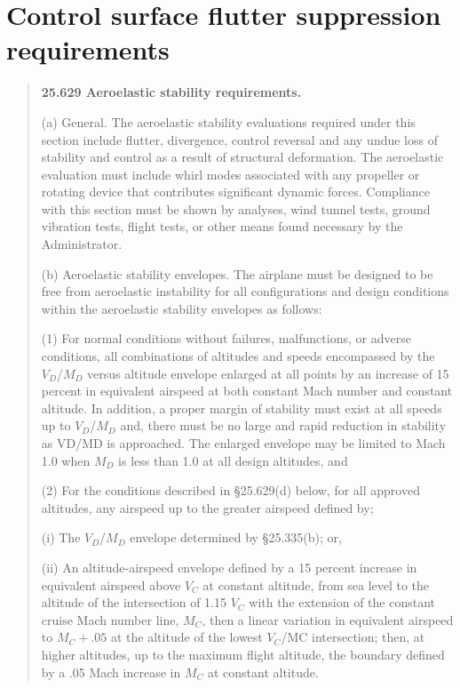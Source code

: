 \section{Control surface flutter suppression requirements}

\begin{quotation}
\begin{scriptsize}

\textbf{25.629   Aeroelastic stability requirements.}

(a) General. The aeroelastic stability evaluations required under this section include flutter, divergence, control reversal and any undue loss of stability and control as a result of structural deformation. The aeroelastic evaluation must include whirl modes associated with any propeller or rotating device that contributes significant dynamic forces. Compliance with this section must be shown by analyses, wind tunnel tests, ground vibration tests, flight tests, or other means found necessary by the Administrator.

(b) Aeroelastic stability envelopes. The airplane must be designed to be free from aeroelastic instability for all configurations and design conditions within the aeroelastic stability envelopes as follows:

(1) For normal conditions without failures, malfunctions, or adverse conditions, all combinations of altitudes and speeds encompassed by the $V_D$/$M_D$ versus altitude envelope enlarged at all points by an increase of 15 percent in equivalent airspeed at both constant Mach number and constant altitude. In addition, a proper margin of stability must exist at all speeds up to $V_D$/$M_D$ and, there must be no large and rapid reduction in stability as VD/MD is approached. The enlarged envelope may be limited to Mach 1.0 when $M_D$ is less than 1.0 at all design altitudes, and

(2) For the conditions described in §25.629(d) below, for all approved altitudes, any airspeed up to the greater airspeed defined by;

(i) The $V_D$/$M_D$ envelope determined by §25.335(b); or,

(ii) An altitude-airspeed envelope defined by a 15 percent increase in equivalent airspeed above $V_C$ at constant altitude, from sea level to the altitude of the intersection of 1.15 $V_C$ with the extension of the constant cruise Mach number line, $M_C$, then a linear variation in equivalent airspeed to $M_C+.05$ at the altitude of the lowest $V_C$/MC intersection; then, at higher altitudes, up to the maximum flight altitude, the boundary defined by a .05 Mach increase in $M_C$ at constant altitude.


\end{scriptsize}
\end{quotation}
